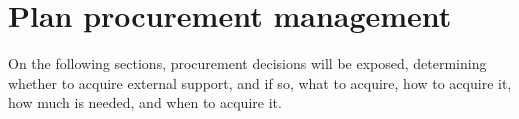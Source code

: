 \chapter{Plan procurement management}
On the following sections, procurement decisions  will be exposed, determining whether to acquire external support, and if so, what to acquire, how to acquire it, how much is needed, and when to acquire it.

